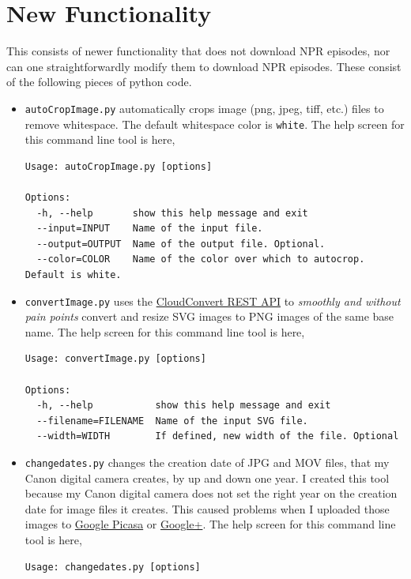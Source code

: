 \documentclass[]{article}
\begin{document}
\section{New Functionality}
This consists of newer functionality that does not download NPR episodes, nor can one straightforwardly modify them to download NPR episodes. These consist of the following pieces of python code.
\begin{itemize}
 \item {\verb|autoCropImage.py|} automatically crops image (png, jpeg, tiff, etc.) files to remove whitespace. The default whitespace color is {\verb|white|}. The help screen for this command line tool is here,
\begin{verbatim}
Usage: autoCropImage.py [options]

Options:
  -h, --help       show this help message and exit
  --input=INPUT    Name of the input file.
  --output=OUTPUT  Name of the output file. Optional.
  --color=COLOR    Name of the color over which to autocrop. Default is white.
\end{verbatim}
 
 \item {\verb|convertImage.py|} uses the \href{https://cloudconvert.com/apiconsole}{CloudConvert REST API} to \textit{smoothly and without pain points} convert and resize SVG images to PNG images of the same base name. The help screen for this command line tool is here,
\begin{verbatim}
Usage: convertImage.py [options]

Options:
  -h, --help           show this help message and exit
  --filename=FILENAME  Name of the input SVG file.
  --width=WIDTH        If defined, new width of the file. Optional
\end{verbatim}
 
 \item {\verb|changedates.py|} changes the creation date of JPG and MOV files, that my Canon digital camera creates, by up and down one year. I created this tool because my Canon digital camera does not set the right year on the creation date for image files it creates. This caused problems when I uploaded those images to \href{https://picasaweb.google.com/home}{Google Picasa} or \href{https://plus.google.com/}{Google+}. The help screen for this command line tool is here,
\begin{verbatim}
Usage: changedates.py [options]


\end{verbatim}
\end{itemize}
\end{document}
